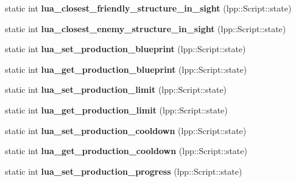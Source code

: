 \begin{DoxyCompactItemize}
\item 
static int {\bfseries lua\+\_\+closest\+\_\+friendly\+\_\+structure\+\_\+in\+\_\+sight} (lpp\+::\+Script\+::state)\hypertarget{class_lua_interface_a3da0573f72698c422671ced20bde9575}{}\label{class_lua_interface_a3da0573f72698c422671ced20bde9575}

\item 
static int {\bfseries lua\+\_\+closest\+\_\+enemy\+\_\+structure\+\_\+in\+\_\+sight} (lpp\+::\+Script\+::state)\hypertarget{class_lua_interface_ae0109461341de76547397311d25c4cf8}{}\label{class_lua_interface_ae0109461341de76547397311d25c4cf8}

\item 
static int {\bfseries lua\+\_\+set\+\_\+production\+\_\+blueprint} (lpp\+::\+Script\+::state)\hypertarget{class_lua_interface_ad7b9ff4cc392ef2825f69f24337709d8}{}\label{class_lua_interface_ad7b9ff4cc392ef2825f69f24337709d8}

\item 
static int {\bfseries lua\+\_\+get\+\_\+production\+\_\+blueprint} (lpp\+::\+Script\+::state)\hypertarget{class_lua_interface_a5db0cfa20e19f72b5fbc084cb9566b0e}{}\label{class_lua_interface_a5db0cfa20e19f72b5fbc084cb9566b0e}

\item 
static int {\bfseries lua\+\_\+set\+\_\+production\+\_\+limit} (lpp\+::\+Script\+::state)\hypertarget{class_lua_interface_a69d5f44e78f9d42d21a2f182efcb54b9}{}\label{class_lua_interface_a69d5f44e78f9d42d21a2f182efcb54b9}

\item 
static int {\bfseries lua\+\_\+get\+\_\+production\+\_\+limit} (lpp\+::\+Script\+::state)\hypertarget{class_lua_interface_a8a361328be7e5109fe7857411d04d36a}{}\label{class_lua_interface_a8a361328be7e5109fe7857411d04d36a}

\item 
static int {\bfseries lua\+\_\+set\+\_\+production\+\_\+cooldown} (lpp\+::\+Script\+::state)\hypertarget{class_lua_interface_a104f59381e0d739820beff4ad1c0bd48}{}\label{class_lua_interface_a104f59381e0d739820beff4ad1c0bd48}

\item 
static int {\bfseries lua\+\_\+get\+\_\+production\+\_\+cooldown} (lpp\+::\+Script\+::state)\hypertarget{class_lua_interface_a28f9e2308cab674bd4dc821b070071db}{}\label{class_lua_interface_a28f9e2308cab674bd4dc821b070071db}

\item 
static int {\bfseries lua\+\_\+set\+\_\+production\+\_\+progress} (lpp\+::\+Script\+::state)\hypertarget{class_lua_interface_a51a87fb74f00c6ab1136a52537e5a607}{}\label{class_lua_interface_a51a87fb74f00c6ab1136a52537e5a607}


\end{DoxyCompactItemize}
